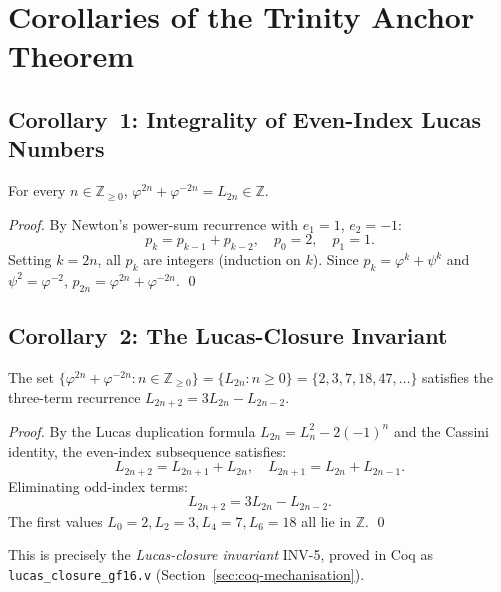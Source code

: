 
\section{Corollaries of the Trinity Anchor Theorem}%
\label{sec:corollaries}

\subsection{Corollary~1: Integrality of Even-Index Lucas Numbers}

\begin{corollary}\label{cor:lucas-integrality}
For every $n \in \mathbb{Z}_{\geq 0}$,
$\varphi^{2n}+\varphi^{-2n} = L_{2n} \in \mathbb{Z}$.
\end{corollary}
\begin{proof}
By Newton's power-sum recurrence with $e_{1}=1$, $e_{2}=-1$:
\[
  p_{k} = p_{k-1} + p_{k-2},\quad
  p_{0}=2,\quad p_{1}=1.
\]
Setting $k=2n$, all $p_{k}$ are integers (induction on $k$).
Since $p_{k} = \varphi^{k}+\psi^{k}$ and $\psi^{2} = \varphi^{-2}$,
$p_{2n} = \varphi^{2n}+\varphi^{-2n}$.
\qed
\end{proof}

\subsection{Corollary~2: The Lucas-Closure Invariant}

\begin{corollary}\label{cor:lucas-closure}
The set $\{\varphi^{2n}+\varphi^{-2n} : n \in \mathbb{Z}_{\geq 0}\}
= \{L_{2n} : n \geq 0\} = \{2, 3, 7, 18, 47, \ldots\}$
satisfies the three-term recurrence
$L_{2n+2} = 3L_{2n} - L_{2n-2}$.
\end{corollary}
\begin{proof}
By the Lucas duplication formula $L_{2n} = L_{n}^{2}-2(-1)^{n}$
and the Cassini identity, the even-index subsequence satisfies:
\[
  L_{2n+2} = L_{2n+1}+L_{2n},\quad
  L_{2n+1} = L_{2n}+L_{2n-1}.
\]
Eliminating odd-index terms:
\[
  L_{2n+2} = 3L_{2n} - L_{2n-2}.
\]
The first values $L_{0}=2, L_{2}=3, L_{4}=7, L_{6}=18$ all lie
in $\mathbb{Z}$.
\qed
\end{proof}

This is precisely the \emph{Lucas-closure invariant} INV-5,
proved in Coq as \texttt{lucas\_closure\_gf16.v}
(Section~\ref{sec:coq-mechanisation}).

